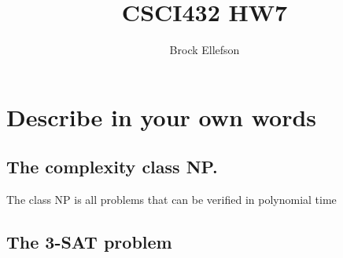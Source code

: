 \documentclass[10pt,a4paper]{article}
\author{Brock Ellefson}
\title{CSCI432 HW7}
\begin{document}
\maketitle
\section{Describe in your own words}
\subsection{The complexity class NP.}
The class NP is all problems that can be verified in polynomial time
\subsection{The 3-SAT problem}
\end{document}
